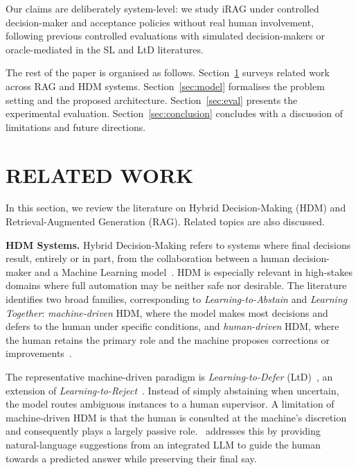 \documentclass[a4paper,twoside]{article}
\begin{document}
Our claims are deliberately system-level: we study iRAG under controlled decision-maker and acceptance policies without real human involvement, following previous controlled evaluations with simulated decision-makers or oracle-mediated in the SL
\cite{zeni2019fixing,bontempelli2020learning,Mazzoni2024frank} and LtD
\cite{mozannar2020consistent,verma2023learning,tailor2024learning}
literatures.

The rest of the paper is organised as follows. 
Section~\ref{sec:related} surveys related work across RAG and HDM systems. 
Section~\ref{sec:model} formalises the problem setting and the proposed architecture. 
Section~\ref{sec:eval} presents the experimental evaluation. 
Section~\ref{sec:conclusion} concludes with a discussion of limitations and future directions.

\section{\uppercase{Related Work}}
\label{sec:related}
In this section, we review the literature on Hybrid Decision-Making (HDM) and Retrieval-Augmented Generation (RAG). Related topics are also discussed.

\textbf{HDM Systems.} 
Hybrid Decision-Making refers to systems where final decisions result, entirely or in part, from the collaboration between a human decision-maker and a Machine Learning model~\cite{wang2021hybrid}. HDM is especially relevant in high-stakes domains where full automation may be neither safe nor desirable. The literature identifies two broad families, corresponding to \textit{Learning-to-Abstain} and \textit{Learning Together}: \textit{machine-driven} HDM, where the model makes most decisions and defers to the human under specific conditions, and \textit{human-driven} HDM, where the human retains the primary role and the machine proposes corrections or improvements~\cite{punzi2024ai}.

The representative machine-driven paradigm is \textit{Learning-to-Defer} (LtD)~\cite{madras2018predict,mozannar2020consistent,liu2022incorporating}, an extension of \textit{Learning-to-Reject}~\cite{cortes2016learning,zhang2023survey}. Instead of simply abstaining when uncertain, the model routes ambiguous instances to a human supervisor. A limitation of machine-driven HDM is that the human is consulted at the machine's discretion and consequently plays a largely passive role.~\cite{banerjee2024learning} addresses this by providing natural-language suggestions from an integrated LLM to guide the human towards a predicted answer while preserving their final say.
\end{document}
